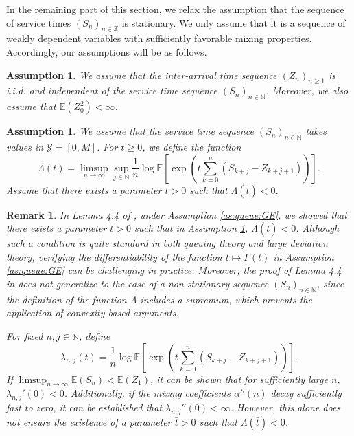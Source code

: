 \documentclass[a4paper,10pt]{article}
\newtheorem{remark}[theorem]{Remark}
\newtheorem{assumption}[theorem]{Assumption}
\newcommand{\Z}{\mathbb{Z}}
\begin{document}
In the remaining part of this section, we relax the assumption that the sequence of service times $(S_n)_{n\in\Z}$ is stationary. We only assume that it is a sequence of weakly dependent variables with sufficiently favorable mixing properties. Accordingly, our assumptions will be as follows.


\begin{assumption}\label{as:queue:Z} %
	We assume that the inter-arrival time sequence $(Z_n)_{n \geq 1}$ is i.i.d. and independent of the service time sequence $(S_n)_{n \in \mathbb{N}}$.
	Moreover, we also assume that $\mathbb{E}(Z_0^2) < \infty$.
\end{assumption}

\begin{assumption}\label{as:queue:S} %
	We assume that the service time sequence $(S_n)_{n \in \mathbb{N}}$ takes values in $\mathcal{Y} = [0, M]$. 
	For $t\ge 0$, we define the function
	\[
	\Lambda(t) = \limsup_{n \to \infty} \sup_{j \in \mathbb{N}} 
	\frac{1}{n} \log \mathbb{E} \left[ \exp \left( t \sum_{k=0}^n (S_{k+j} - Z_{k+j+1}) \right) \right].
	\]
	Assume that there exists a parameter $\bar{t} > 0$ such that $\Lambda(\bar{t}) < 0$.
\end{assumption}

\begin{remark}\label{rem:munder}
	In Lemma 4.4 of \cite{lovas}, under Assumption \ref{as:queue:GE}, we showed that there exists a parameter $\bar{t} > 0$ such that 
	in Assumption \ref{as:queue:S}, $\Lambda(\bar{t}) < 0$. Although such a condition is quite standard in both queuing theory and large deviation theory, verifying the differentiability of the function $t \mapsto \Gamma(t)$ in Assumption \ref{as:queue:GE} can be challenging in practice. 
	Moreover, the proof of Lemma 4.4 in \cite{lovas} does not generalize to the case of a non-stationary sequence $(S_n)_{n \in \mathbb{N}}$, since the definition of the function $\Lambda$ includes a supremum, which prevents the application of convexity-based arguments.
	
	For fixed $n, j \in \mathbb{N}$, define
	\[
	\lambda_{n,j}(t) = \frac{1}{n} \log \mathbb{E} \left[ \exp \left( t \sum_{k=0}^n (S_{k+j} - Z_{k+j+1}) \right) \right].
	\]
	If $\limsup_{n \to \infty} \mathbb{E}(S_n) < \mathbb{E}(Z_1)$, it can be shown that for sufficiently large $n$, $\lambda_{n,j}'(0) < 0$. Additionally, if the mixing coefficients $\alpha^S(n)$ decay sufficiently fast to zero, it can be established that $\lambda_{n,j}''(0) < \infty$. However, this alone does not ensure the existence of a parameter $\bar{t} > 0$ such that $\Lambda(\bar{t}) < 0$. 
\end{remark}
\end{document}
